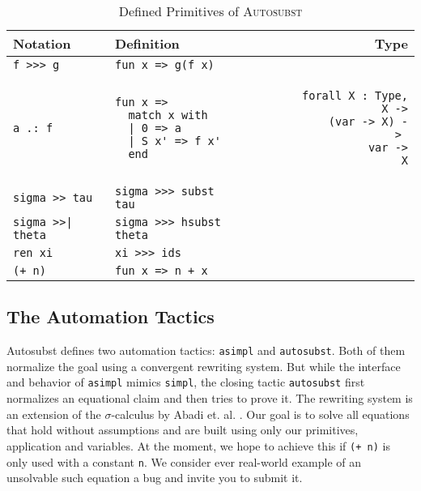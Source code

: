 \documentclass{scrartcl}
\newcommand{\Autosubst}{\textsc{Autosubst}\xspace}
\newcommand{\stackr}[2]{\vtop{\setbox0\hbox{\strut #1}\copy0\hbox to\wd0{\hss\strut #2}}}
\newcommand{\lst}{\lstinline}
\begin{document}
\begin{table}
  \centering
  \lstset{boxpos=t, aboveskip=0em, belowskip=0em}
  \begin{tabular}{l l r}
  Notation         & Definition                                       & Type                                   \\\hline\noalign{\vspace{0.5em}}
  
  \lst$f >>> g$    & \lst$fun x => g(f x)$                            & \stackr{\lst$forall A B C : Type, (A -> B) ->$}{\stackr{\lst$(B -> C) ->$}{\lst$A -> C$}} \\\noalign{\vspace{-1em}}
  \begin{lstlisting}
a .: f
  \end{lstlisting}
&\begin{lstlisting}
fun x => 
  match x with 
  | 0 => a 
  | S x' => f x' 
  end    
\end{lstlisting}
&
\begin{lstlisting}
forall X : Type,         X ->
           (var -> X) -> 
                var -> X
\end{lstlisting}  \\
  \lst$sigma >> tau$& \lst$sigma >>> subst tau$    & 
\stackr{\lst$(var -> term) ->$}{\stackr{\lst$(var -> term) ->$}{\lst$var -> term$}}     \\
\lst$sigma >>| theta$& \lst$sigma >>> hsubst theta$ & 
\stackr{\lst$(var -> term1) ->$}{\stackr{\lst$(var -> term2) ->$}{\lst$var -> term1$}} \\
\lst$ren xi$ & \lst$xi >>> ids$ & \stackr{\lst$(var -> var) ->$}{\lst$var -> term$} \\
\lst$(+ n)$ & \lst$fun x => n + x$ & \stackr{\lst$var ->$}{\lst$var -> var$}
\end{tabular}
  \caption{Defined Primitives of \Autosubst}
  \label{tab:defined-ops}
\end{table}

\subsection{The Automation Tactics}
\label{sec:lstautosubst-tactic}

Autosubst defines two automation tactics: \lst$asimpl$ and \lst$autosubst$.
Both of them normalize the goal using a convergent rewriting system.
But while the interface and behavior of \lst$asimpl$ mimics \lst$simpl$, the closing tactic \lst$autosubst$ first normalizes an equational claim and then tries to prove it.
The rewriting system is an extension of the $\sigma$-calculus by Abadi et. al.  \cite{DBLP:journals/jfp/AbadiCCL91}.
Our goal is to solve all equations that hold without assumptions and are built using only our primitives, application and variables. At the moment, we hope to achieve this if \lst$(+ n)$ is only used with a constant \lst$n$. We consider ever real-world example of an unsolvable such equation a bug and invite you to submit it.
\end{document}
